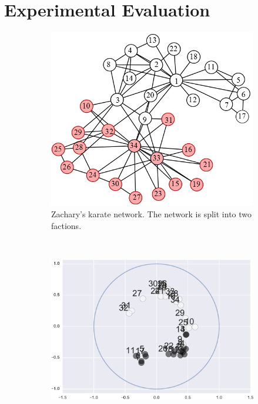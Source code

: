 \documentclass[sigconf, review]{acmart}
\begin{document}

\section{Experimental Evaluation}
\begin{figure}[t!]
    \centering
    \begin{subfigure}[t]{0.4\textwidth}
        \centering
        \includegraphics[width = \hsize]{zachary_karate}
        \caption{Zachary's karate network. The network is split into two factions.}
    \end{subfigure}%
    \\ 
    \begin{subfigure}[t]{0.48\textwidth}
        \centering
        \includegraphics[width = \hsize]{hyperbolic_karate}

\end{subfigure}
\end{figure}
\end{document}
